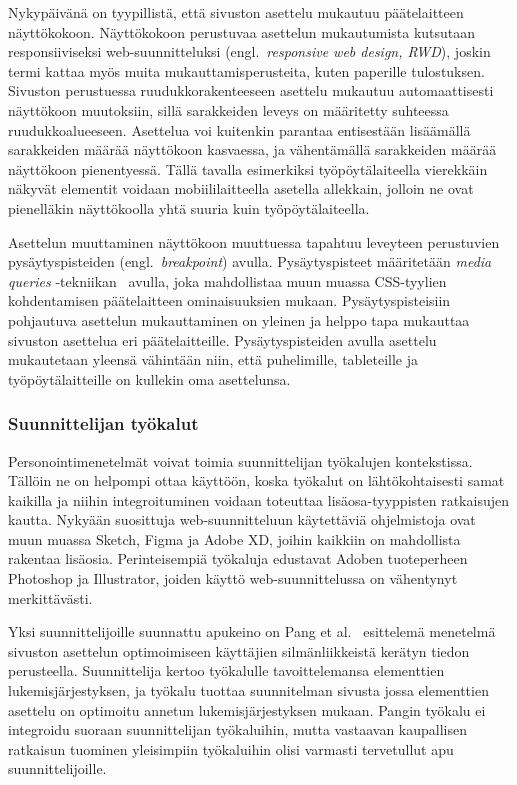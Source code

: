 \documentclass[finnish, 12pt, a4paper, elec, utf8, a-1b, online]{aaltothesis}
\begin{document}
Nykypäivänä on tyypillistä, että sivuston asettelu mukautuu päätelaitteen
näyttökokoon. Näyttökokoon perustuvaa asettelun mukautumista kutsutaan
responsiiviseksi web-suunnitteluksi (engl.~\textit{responsive web design, RWD}),
joskin termi kattaa myös muita mukauttamisperusteita, kuten paperille
tulostuksen. Sivuston perustuessa ruudukkorakenteeseen asettelu mukautuu
automaattisesti näyttökoon muutoksiin, sillä sarakkeiden leveys on määritetty
suhteessa ruudukkoalueeseen. Asettelua voi kuitenkin parantaa entisestään
lisäämällä sarakkeiden määrää näyttökoon kasvaessa, ja vähentämällä sarakkeiden
määrää näyttökoon pienentyessä. Tällä tavalla esimerkiksi työpöytälaiteella
vierekkäin näkyvät elementit voidaan mobiililaitteella asetella allekkain,
jolloin ne ovat pienelläkin näyttökoolla yhtä suuria kuin työpöytälaiteella.

Asettelun muuttaminen näyttökoon muuttuessa tapahtuu leveyteen perustuvien
pysäytyspisteiden (engl.~\textit{breakpoint}) avulla. Pysäytyspisteet
määritetään \textit{media queries} -tekniikan~\cite{Rivoal:12:MQ} avulla, joka
mahdollistaa muun muassa CSS-tyylien kohdentamisen päätelaitteen ominaisuuksien
mukaan. Pysäytyspisteisiin pohjautuva asettelun mukauttaminen on yleinen ja
helppo tapa mukauttaa sivuston asettelua eri päätelaitteille. Pysäytyspisteiden
avulla asettelu mukautetaan yleensä vähintään niin, että puhelimille,
tableteille ja työpöytälaitteille on kullekin oma asettelunsa.

\subsubsection{Suunnittelijan työkalut}

Personointimenetelmät voivat toimia suunnittelijan työkalujen kontekstissa.
Tällöin ne on helpompi ottaa käyttöön, koska työkalut on lähtökohtaisesti samat
kaikilla ja niihin integroituminen voidaan toteuttaa lisäosa-tyyppisten
ratkaisujen kautta. Nykyään suosittuja web-suunnitteluun käytettäviä
ohjelmistoja ovat muun muassa Sketch, Figma ja Adobe XD, joihin kaikkiin on
mahdollista rakentaa lisäosia. Perinteisempiä työkaluja edustavat Adoben
tuoteperheen Photoshop ja Illustrator, joiden käyttö web-suunnittelussa on
vähentynyt merkittävästi.

Yksi suunnittelijoille suunnattu apukeino on Pang et al.~\cite{10.1145/2980179.2982422}
esittelemä menetelmä sivuston asettelun optimoimiseen käyttäjien
silmänliikkeistä kerätyn tiedon perusteella. Suunnittelija kertoo työkalulle
tavoittelemansa elementtien lukemisjärjestyksen, ja työkalu tuottaa suunnitelman
sivusta jossa elementtien asettelu on optimoitu annetun lukemisjärjestyksen
mukaan. Pangin työkalu ei integroidu suoraan suunnittelijan työkaluihin, mutta
vastaavan kaupallisen ratkaisun tuominen yleisimpiin työkaluihin olisi varmasti
tervetullut apu suunnittelijoille.
\end{document}
